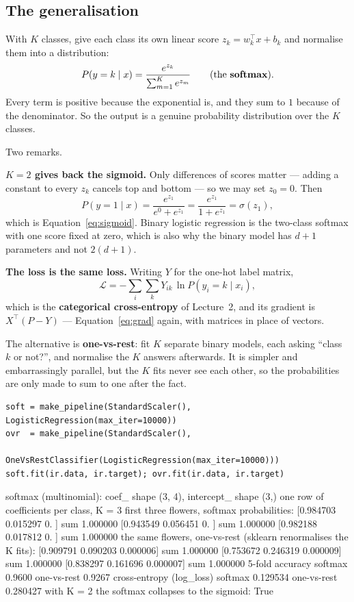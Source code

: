 \documentclass[11pt]{article}
\begin{document}
\subsection{The generalisation}

With $K$ classes, give each class its own linear score
$z_k = w_k^{\!\top}x + b_k$ and normalise them into a distribution:
\begin{equation}
  P(y = k \mid x) = \frac{e^{z_k}}{\sum_{m=1}^{K} e^{z_m}}
  \qquad\text{(the \textbf{softmax})}.
  \label{eq:softmax}
\end{equation}
Every term is positive because the exponential is, and they sum to $1$ because
of the denominator. So the output is a genuine probability distribution over
the $K$ classes.

Two remarks.

\textbf{$K = 2$ gives back the sigmoid.} Only differences of scores matter ---
adding a constant to every $z_k$ cancels top and bottom --- so we may set
$z_0 = 0$. Then
\[
  P(y = 1 \mid x) = \frac{e^{z_1}}{e^{0} + e^{z_1}}
                  = \frac{e^{z_1}}{1 + e^{z_1}} = \sigma(z_1),
\]
which is Equation~\eqref{eq:sigmoid}. Binary logistic regression is the
two-class softmax with one score fixed at zero, which is also why the binary
model has $d+1$ parameters and not $2(d+1)$.

\textbf{The loss is the same loss.} Writing $Y$ for the one-hot label matrix,
\[
  \mathcal{L} = -\sum_{i}\sum_{k} Y_{ik}\,\ln P(y_i = k \mid x_i),
\]
which is the \textbf{categorical cross-entropy} of Lecture~2, and its gradient
is $X^{\!\top}(P - Y)$ --- Equation~\eqref{eq:grad} again, with matrices in
place of vectors.

The alternative is \textbf{one-vs-rest}: fit $K$ separate binary models, each
asking ``class $k$ or not?'', and normalise the $K$ answers afterwards. It is
simpler and embarrassingly parallel, but the $K$ fits never see each other, so
the probabilities are only made to sum to one after the fact.

\begin{lstlisting}
soft = make_pipeline(StandardScaler(), LogisticRegression(max_iter=10000))
ovr  = make_pipeline(StandardScaler(),
                     OneVsRestClassifier(LogisticRegression(max_iter=10000)))
soft.fit(ir.data, ir.target); ovr.fit(ir.data, ir.target)
\end{lstlisting}
\begin{codeout}
softmax (multinomial): coef_ shape (3, 4), intercept_ shape (3,)
   one row of coefficients per class, K = 3
first three flowers, softmax probabilities:
   [0.984703 0.015297 0.      ]  sum 1.000000
   [0.943549 0.056451 0.      ]  sum 1.000000
   [0.982188 0.017812 0.      ]  sum 1.000000
the same flowers, one-vs-rest (sklearn renormalises the K fits):
   [0.909791 0.090203 0.000006]  sum 1.000000
   [0.753672 0.246319 0.000009]  sum 1.000000
   [0.838297 0.161696 0.000007]  sum 1.000000
5-fold accuracy  softmax 0.9600    one-vs-rest 0.9267
cross-entropy (log_loss) softmax 0.129534   one-vs-rest 0.280427
with K = 2 the softmax collapses to the sigmoid: True
\end{codeout}
\end{document}
